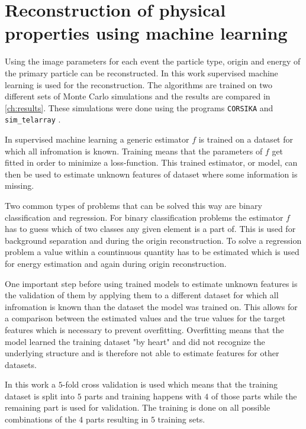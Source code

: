\chapter{Reconstruction of physical properties using machine learning}
\label{ch:ml}
Using the image parameters for each event the particle type, origin and energy of the primary particle can be reconstructed.
In this work supervised machine learning is used for the reconstruction.
The algorithms are trained on two different sets of Monte Carlo simulations and the results are compared in \autoref{ch:results}.
These simulations were done using the programs \texttt{CORSIKA} and \texttt{sim\_telarray} \cite{simulations}.

In supervised machine learning a generic estimator $f$ is trained on a dataset for which all infromation is known.
Training means that the parameters of $f$ get fitted in order to minimize a loss-function.
This trained estimator, or model, can then be used to estimate unknown features of dataset where some information is missing.

Two common types of problems that can be solved this way are binary classification and regression. 
For binary classification problems the estimator $f$ has to guess which of two classes any given element is a part of. 
This is used for background separation and during the origin reconstruction.
To solve a regression problem a value within a countinuous quantity has to be estimated which is used for energy estimation and 
again during origin reconstruction.

One important step before using trained models to estimate unknown features is the validation of them by applying them to a different dataset 
for which all infromation is known than the dataset the model was trained on.
This allows for a comparison between the estimated values and the true values for the target features which is necessary to prevent overfitting.
Overfitting means that the model learned the training dataset "by heart" and did not recognize the underlying structure and is therefore not able
to estimate features for other datasets.

In this work a $\num{5}$-fold cross validation is used which means that the training dataset is split into $\num{5}$ parts and training happens 
with $\num{4}$ of those parts while the remaining part is used for validation. 
The training is done on all possible combinations of the $\num{4}$ parts resulting in $\num{5}$ training sets.


